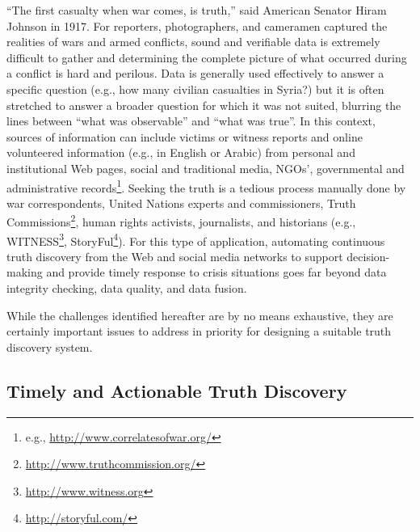 \documentclass[prodmode,acmtecs]{acmsmall} %
\begin{document}
``The first casualty when war comes, is truth,'' said American Senator Hiram Johnson in 1917. 
For reporters, photographers, and cameramen captured the realities of wars and armed conflicts, sound 
and verifiable data is extremely difficult to gather and determining the complete picture of what 
occurred during a conflict is hard and perilous.
Data is generally used effectively to answer a specific question (e.g., how many civilian casualties in Syria?) 
but it is often stretched to answer a broader question for which it was not suited, blurring the 
lines between ``what was observable'' and  ``what was true''. In this context, 
sources of information can include victims or witness reports  and online volunteered information (e.g., in English or Arabic) 
from personal and institutional Web pages, social and traditional media, NGOs', governmental and 
administrative records\footnote{\scriptsize{e.g., \url{http://www.correlatesofwar.org/}}}. %
Seeking the truth is a tedious process manually done by war correspondents, United Nations experts and commissioners, 
Truth Commissions\footnote{\scriptsize{\url{ http://www.truthcommission.org/}}}, human rights activists, journalists, and historians 
 (e.g., WITNESS\footnote{\scriptsize{\url{http://www.witness.org}}}, StoryFul\footnote{\scriptsize{\url{http://storyful.com/}}}). 
For this type of application, automating continuous truth discovery from the Web and social media networks to support decision-making and provide timely response to crisis situations goes far beyond data integrity checking, data quality, and data fusion. 




 While the challenges identified hereafter  are by no means exhaustive, they are certainly important issues to address in priority for designing a suitable truth discovery system.


\subsection{Timely and Actionable Truth Discovery} 
\end{document}
